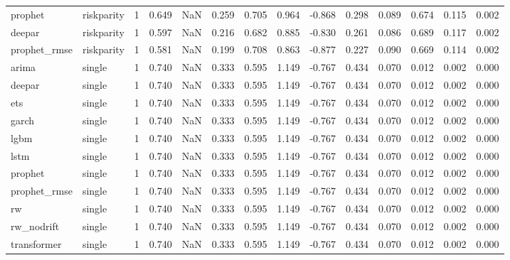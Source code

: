 \begin{table}
\begin{tabular}{llrrrrrrrrrrrr}
prophet & riskparity & 1 & 0.649 & NaN & 0.259 & 0.705 & 0.964 & -0.868 & 0.298 & 0.089 & 0.674 & 0.115 & 0.002 \\
deepar & riskparity & 1 & 0.597 & NaN & 0.216 & 0.682 & 0.885 & -0.830 & 0.261 & 0.086 & 0.689 & 0.117 & 0.002 \\
prophet\_rmse & riskparity & 1 & 0.581 & NaN & 0.199 & 0.708 & 0.863 & -0.877 & 0.227 & 0.090 & 0.669 & 0.114 & 0.002 \\
arima & single & 1 & 0.740 & NaN & 0.333 & 0.595 & 1.149 & -0.767 & 0.434 & 0.070 & 0.012 & 0.002 & 0.000 \\
deepar & single & 1 & 0.740 & NaN & 0.333 & 0.595 & 1.149 & -0.767 & 0.434 & 0.070 & 0.012 & 0.002 & 0.000 \\
ets & single & 1 & 0.740 & NaN & 0.333 & 0.595 & 1.149 & -0.767 & 0.434 & 0.070 & 0.012 & 0.002 & 0.000 \\
garch & single & 1 & 0.740 & NaN & 0.333 & 0.595 & 1.149 & -0.767 & 0.434 & 0.070 & 0.012 & 0.002 & 0.000 \\
lgbm & single & 1 & 0.740 & NaN & 0.333 & 0.595 & 1.149 & -0.767 & 0.434 & 0.070 & 0.012 & 0.002 & 0.000 \\
lstm & single & 1 & 0.740 & NaN & 0.333 & 0.595 & 1.149 & -0.767 & 0.434 & 0.070 & 0.012 & 0.002 & 0.000 \\
prophet & single & 1 & 0.740 & NaN & 0.333 & 0.595 & 1.149 & -0.767 & 0.434 & 0.070 & 0.012 & 0.002 & 0.000 \\
prophet\_rmse & single & 1 & 0.740 & NaN & 0.333 & 0.595 & 1.149 & -0.767 & 0.434 & 0.070 & 0.012 & 0.002 & 0.000 \\
rw & single & 1 & 0.740 & NaN & 0.333 & 0.595 & 1.149 & -0.767 & 0.434 & 0.070 & 0.012 & 0.002 & 0.000 \\
rw\_nodrift & single & 1 & 0.740 & NaN & 0.333 & 0.595 & 1.149 & -0.767 & 0.434 & 0.070 & 0.012 & 0.002 & 0.000 \\
transformer & single & 1 & 0.740 & NaN & 0.333 & 0.595 & 1.149 & -0.767 & 0.434 & 0.070 & 0.012 & 0.002 & 0.000 \\
\bottomrule
\end{tabular}
\end{table}
